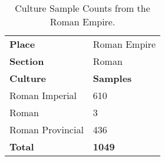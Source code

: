 \documentclass[11pt]{article}
\begin{document}
\begin{table}[ht!]
    \centering
    \small
    \begin{tabularx}{\columnwidth}{Xl}
        \hline
        \rowcolor{brown!30}\textbf{Place} & Roman Empire \\

        \rowcolor{brown!20}\textbf{Section} & Roman \\
        \hline
        \rowcolor{brown!10}\textbf{Culture} & \textbf{Samples} \\
        \hline
        Roman Imperial & 610 \\
        Roman & 3 \\
        Roman Provincial & 436 \\
        \hline
        \rowcolor{brown!10}\textbf{Total}&\textbf{1049}\\
         \hline
    \end{tabularx}
    \caption{Culture Sample Counts from the Roman Empire.}
    \label{tab:culture-sample-rom}
\end{table}
\end{document}
